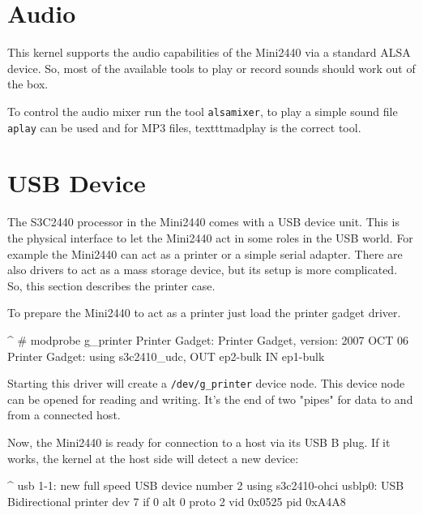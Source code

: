 
\section{Audio}						\label{sec:AUDIO}

This kernel supports the audio capabilities of the Mini2440 via a standard
ALSA device. So, most of the available tools to play or record sounds should
work out of the box.

To control the audio mixer run the tool \texttt{alsamixer}, to play a simple
sound file \texttt{aplay} can be used and for MP3 files, texttt{madplay} is the
correct tool.


\section{USB Device}					\label{sec:USBgadget}

The S3C2440 processor in the Mini2440 comes with a USB device unit. This is
the physical interface to let the Mini2440 act in some roles in the USB world.
For example the Mini2440 can act as a printer or a simple serial adapter.
There are also drivers to act as a mass storage device, but its setup is more
complicated. So, this section describes the printer case.

To prepare the Mini2440 to act as a printer just load the printer gadget driver.

\begin{ptxshell}[escapechar=|]{^}
# modprobe g_printer
Printer Gadget: Printer Gadget, version: 2007 OCT 06
Printer Gadget: using s3c2410_udc, OUT ep2-bulk IN ep1-bulk
\end{ptxshell}

Starting this driver will create a \texttt{/dev/g\_printer} device node. This
device node can be opened for reading and writing. It's the end of two
"pipes" for data to and from a connected host.

Now, the Mini2440 is ready for connection to a host via its USB B plug.
If it works, the kernel at the host side will detect a new device:

\begin{ptxshell}[escapechar=|]{^}
usb 1-1: new full speed USB device number 2 using s3c2410-ohci
usblp0: USB Bidirectional printer dev 7 if 0 alt 0 proto 2 vid 0x0525 pid 0xA4A8
\end{ptxshell}

